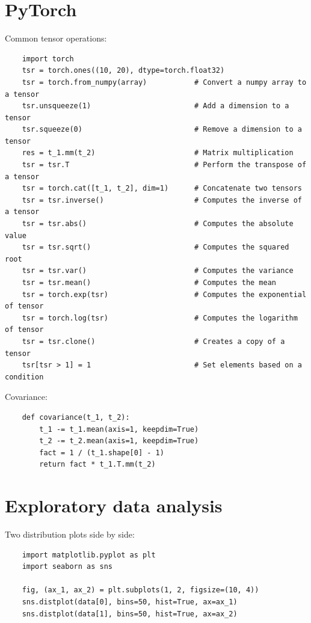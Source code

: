 \documentclass[12pt]{report}
\begin{document}
        
    \section{PyTorch}
        Common tensor operations:
        \begin{verbatim}
    import torch
    tsr = torch.ones((10, 20), dtype=torch.float32)
    tsr = torch.from_numpy(array)           # Convert a numpy array to a tensor
    tsr.unsqueeze(1)                        # Add a dimension to a tensor
    tsr.squeeze(0)                          # Remove a dimension to a tensor
    res = t_1.mm(t_2)                       # Matrix multiplication
    tsr = tsr.T                             # Perform the transpose of a tensor
    tsr = torch.cat([t_1, t_2], dim=1)      # Concatenate two tensors
    tsr = tsr.inverse()                     # Computes the inverse of a tensor
    tsr = tsr.abs()                         # Computes the absolute value
    tsr = tsr.sqrt()                        # Computes the squared root
    tsr = tsr.var()                         # Computes the variance
    tsr = tsr.mean()                        # Computes the mean
    tsr = torch.exp(tsr)                    # Computes the exponential of tensor
    tsr = torch.log(tsr)                    # Computes the logarithm of tensor
    tsr = tsr.clone()                       # Creates a copy of a tensor
    tsr[tsr > 1] = 1                        # Set elements based on a condition
        \end{verbatim}
        
        Covariance:
        \begin{verbatim}
    def covariance(t_1, t_2):
        t_1 -= t_1.mean(axis=1, keepdim=True)
        t_2 -= t_2.mean(axis=1, keepdim=True)
        fact = 1 / (t_1.shape[0] - 1)
        return fact * t_1.T.mm(t_2)
        \end{verbatim}
    \section{Exploratory data analysis}
        Two distribution plots side by side:
        \begin{verbatim}
    import matplotlib.pyplot as plt
    import seaborn as sns
    
    fig, (ax_1, ax_2) = plt.subplots(1, 2, figsize=(10, 4))
    sns.distplot(data[0], bins=50, hist=True, ax=ax_1)
    sns.distplot(data[1], bins=50, hist=True, ax=ax_2)
        \end{verbatim}
            
\end{document}
